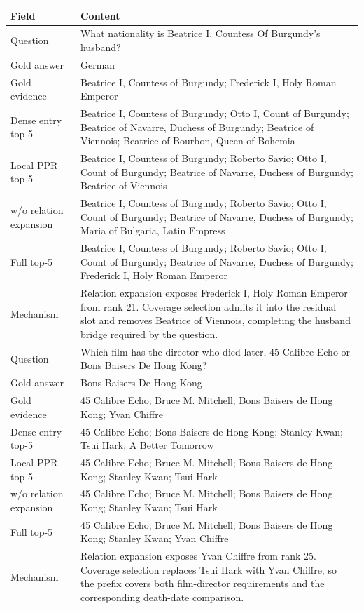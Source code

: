 \begin{center}
\centering
\scriptsize
\setlength{\tabcolsep}{3pt}
\begin{tabular}{p{}p{}}
\toprule
Field & Content \\
\midrule
Question
& What nationality is Beatrice I, Countess Of Burgundy's husband? \\
Gold answer
& German \\
Gold evidence
& Beatrice I, Countess of Burgundy; Frederick I, Holy Roman Emperor \\
Dense entry top-5
& Beatrice I, Countess of Burgundy; Otto I, Count of Burgundy; Beatrice of Navarre, Duchess of Burgundy; Beatrice of Viennois; Beatrice of Bourbon, Queen of Bohemia \\
Local PPR top-5
& Beatrice I, Countess of Burgundy; Roberto Savio; Otto I, Count of Burgundy; Beatrice of Navarre, Duchess of Burgundy; Beatrice of Viennois \\
w/o relation expansion
& Beatrice I, Countess of Burgundy; Roberto Savio; Otto I, Count of Burgundy; Beatrice of Navarre, Duchess of Burgundy; Maria of Bulgaria, Latin Empress \\
Full \methodname{} top-5
& Beatrice I, Countess of Burgundy; Roberto Savio; Otto I, Count of Burgundy; Beatrice of Navarre, Duchess of Burgundy; Frederick I, Holy Roman Emperor \\
Mechanism
& Relation expansion exposes Frederick I, Holy Roman Emperor from rank 21. Coverage selection admits it into the residual slot and removes Beatrice of Viennois, completing the husband bridge required by the question. \\
\midrule
Question
& Which film has the director who died later, 45 Calibre Echo or Bons Baisers De Hong Kong? \\
Gold answer
& Bons Baisers De Hong Kong \\
Gold evidence
& 45 Calibre Echo; Bruce M. Mitchell; Bons Baisers de Hong Kong; Yvan Chiffre \\
Dense entry top-5
& 45 Calibre Echo; Bons Baisers de Hong Kong; Stanley Kwan; Tsui Hark; A Better Tomorrow \\
Local PPR top-5
& 45 Calibre Echo; Bruce M. Mitchell; Bons Baisers de Hong Kong; Stanley Kwan; Tsui Hark \\
w/o relation expansion
& 45 Calibre Echo; Bruce M. Mitchell; Bons Baisers de Hong Kong; Stanley Kwan; Tsui Hark \\
Full \methodname{} top-5
& 45 Calibre Echo; Bruce M. Mitchell; Bons Baisers de Hong Kong; Stanley Kwan; Yvan Chiffre \\
Mechanism
& Relation expansion exposes Yvan Chiffre from rank 25. Coverage selection replaces Tsui Hark with Yvan Chiffre, so the prefix covers both film-director requirements and the corresponding death-date comparison. \\
\bottomrule
\end{tabular}
\end{center}

